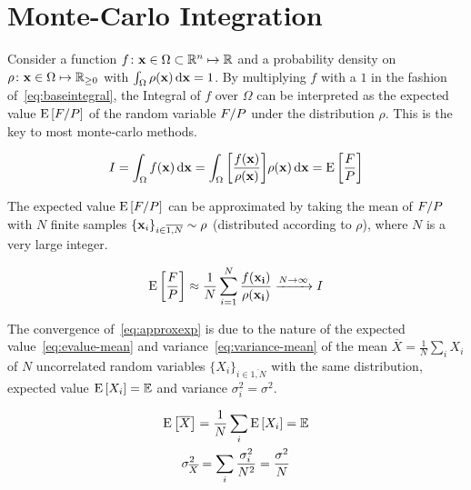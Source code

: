 
\section{Monte-Carlo Integration}%
\label{sec:mcint}

Consider a function
\(f\colon \vb{x}\in\Omega\subset\mathbb{R}^n\mapsto\mathbb{R}\) and a
probability density on
\(\rho\colon \vb{x}\in\Omega\mapsto\mathbb{R}_{\geq 0}\) with
\(\int_{\Omega}\rho(\vb{x})\dd{\vb{x}} = 1\).  By multiplying \(f\)
with a \(1\) in the fashion of~\eqref{eq:baseintegral}, the Integral
of \(f\) over \(\Omega\) can be interpreted as the expected value
\(\operatorname{E}\qty[F/P]\) of the random variable \(F/P\) under the
distribution \(\rho\). This is the key to most monte-carlo methods.

\begin{equation}
  \label{eq:baseintegral}
  I = \int_\Omega f(\vb{x}) \dd{\vb{x}} = \int_\Omega
  \qty[\frac{f(\vb{x})}{\rho(\vb{x})}] \rho(\vb{x}) \dd{\vb{x}} = \operatorname{E}\qty[\frac{F}{P}]
\end{equation}

The expected value \(\operatorname{E}\qty[F/P]\) can be approximated by taking the
mean of \(F/P\) with \(N\) finite samples
\(\{\vb{x}_i\}_{i\in\overline{1,N}}\sim\rho\) (distributed according
to \(\rho\)), where \(N\) is a very large integer.

\begin{equation}
  \label{eq:approxexp}
  \operatorname{E}\qty[\frac{F}{P}] \approx
  \frac{1}{N}\sum_{i=1}^N\frac{f(\vb{x_i})}{\rho(\vb{x_i})}
  \xrightarrow{N\rightarrow\infty} I
\end{equation}

The convergence of~\eqref{eq:approxexp} is due to the nature of the
expected value~\eqref{eq:evalue-mean} and
variance~\eqref{eq:variance-mean} of the mean
\(\overline{X} = \frac{1}{N}\sum_i X_i\) of \(N\) uncorrelated random
variables \(\{X_i\}_{i\in\overline{1,N}}\) with the same distribution,
expected value \(\operatorname{E}\qty[X_i]=\mathbb{E}\) and variance
\(\sigma_i^2 = \sigma^2\).

\begin{gather}
  \operatorname{E}\qty[\overline{X}] = \frac{1}{N}\sum_i\operatorname{E}\qty[X_i] = \mathbb{E} \label{eq:evalue-mean}\\
  \sigma^2_{\overline{X}} = \sum_i\frac{\sigma_i^2}{N^2} =
                            \frac{\sigma^2}{N}  \label{eq:variance-mean}
\end{gather}

